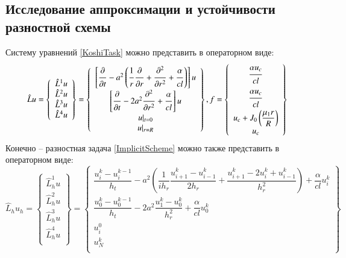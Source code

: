 \documentclass[a4paper,14pt,russian, fleqn]{extreport}
\begin{document}
	\subsection{Исследование аппроксимации и устойчивости разностной схемы}
	Систему уравнений \eqref{KoshiTask} можно представить в операторном виде:
	\begin{equation}\label{OperatorViewKoshiTask}
 	\hat{L}u = \left\{\begin{array}{l}
 		\hat{L}^1u \\
 		\hat{L}^2u \\
 		\hat{L}^3u \\
 		\hat{L}^4u \\
 	\end{array}
 	\right\} = \left\{\begin{array}{c}
 		\left[\dfrac{\strut\partial}{\strut\partial t} - a^2\left( \dfrac{\strut 1}{\strut r}\dfrac{\strut \partial }{\strut \partial r} + \dfrac{\strut \partial^2}{\strut \partial r^2} + \dfrac{\strut \alpha}{\strut cl} \right)\right]u \\
 		\left[\dfrac{\strut \partial }{\strut \partial t} - 2a^2\dfrac{\strut\partial^2}{\strut\partial r^2} + \dfrac{\strut\alpha}{\strut cl}\right]u\\
 		u\vert_{t=0} \\
 		u\vert_{r=R} \\
 	\end{array}\right\}, f = \left\{\begin{array}{c}
 		\dfrac{\strut \alpha u_c}{\strut cl} \\
 		\dfrac{\strut \alpha u_c}{\strut cl} \\
 		u_c + J_0\left(\dfrac{\mu_1 r}{R}\right) \\
 		u_c
 	\end{array}\right\}
	\end{equation}
 	Конечно -- разностная задача \eqref{ImplicitScheme} можно также представить в операторном виде:
 	\begin{equation}\label{OperatorViewImplicitScheme}
 	\hat{L}_hu_h = \left\{\begin{array}{l}
 	\hat{L}_h^1u \\
 	\hat{L}_h^2u \\
 	\hat{L}_h^3u \\
 	\hat{L}_h^4u \\
 	\end{array}
 	\right\} = \left\{\begin{array}{c}
 	\dfrac{u_i^{k}-u_i^{k-1}}{h_t} - a^2\left(\dfrac{1}{ih_r}\dfrac{u_{i+1}^k - u_{i-1}^k}{2h_r} +\dfrac{u_{i+1}^k - 2u_i^k + u_{i-1}^k}{h^2_r}\right) + \dfrac{\alpha}{cl}u_i^k \\
 	\dfrac{u_0^{k}-u_0^{k-1}}{h_t} - 2a^2\dfrac{u_1^k-u_0^k}{h_r^2} + \dfrac{\alpha}{cl}u_0^k\\
 	u_i^0 \\
 	u_N^k \\
 	\end{array}\right\}
 	\end{equation}
 	
\end{document}
